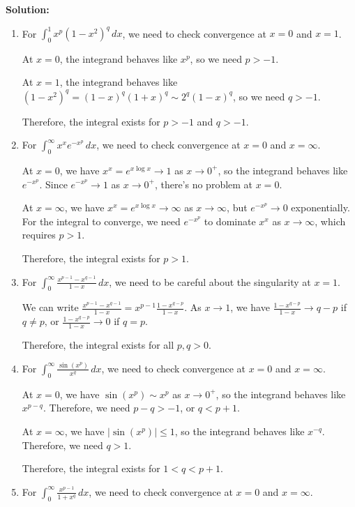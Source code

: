 \bigskip\noindent\textbf{Solution:}
\begin{enumerate}[label=(\alph*)]
\item For $\int_{0}^{1} x^p (1 - x^2)^q \, dx$, we need to check convergence at $x = 0$ and $x = 1$.

At $x = 0$, the integrand behaves like $x^p$, so we need $p > -1$.

At $x = 1$, the integrand behaves like $(1 - x^2)^q = (1 - x)^q (1 + x)^q \sim 2^q (1 - x)^q$, so we need $q > -1$.

Therefore, the integral exists for $p > -1$ and $q > -1$.

\item For $\int_{0}^{\infty} x^x e^{-x^p} \, dx$, we need to check convergence at $x = 0$ and $x = \infty$.

At $x = 0$, we have $x^x = e^{x \log x} \to 1$ as $x \to 0^+$, so the integrand behaves like $e^{-x^p}$. Since $e^{-x^p} \to 1$ as $x \to 0^+$, there's no problem at $x = 0$.

At $x = \infty$, we have $x^x = e^{x \log x} \to \infty$ as $x \to \infty$, but $e^{-x^p} \to 0$ exponentially. For the integral to converge, we need $e^{-x^p}$ to dominate $x^x$ as $x \to \infty$, which requires $p > 1$.

Therefore, the integral exists for $p > 1$.

\item For $\int_{0}^{\infty} \frac{x^{p-1} - x^{q-1}}{1 - x} \, dx$, we need to be careful about the singularity at $x = 1$.

We can write $\frac{x^{p-1} - x^{q-1}}{1 - x} = x^{p-1} \frac{1 - x^{q-p}}{1 - x}$. As $x \to 1$, we have $\frac{1 - x^{q-p}}{1 - x} \to q - p$ if $q \neq p$, or $\frac{1 - x^{q-p}}{1 - x} \to 0$ if $q = p$.

Therefore, the integral exists for all $p, q > 0$.

\item For $\int_{0}^{\infty} \frac{\sin(x^p)}{x^q} \, dx$, we need to check convergence at $x = 0$ and $x = \infty$.

At $x = 0$, we have $\sin(x^p) \sim x^p$ as $x \to 0^+$, so the integrand behaves like $x^{p-q}$. Therefore, we need $p - q > -1$, or $q < p + 1$.

At $x = \infty$, we have $|\sin(x^p)| \leq 1$, so the integrand behaves like $x^{-q}$. Therefore, we need $q > 1$.

Therefore, the integral exists for $1 < q < p + 1$.

\item For $\int_{0}^{\infty} \frac{x^{p-1}}{1 + x^q} \, dx$, we need to check convergence at $x = 0$ and $x = \infty$.


\end{enumerate}
